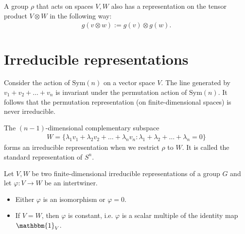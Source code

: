     \begin{example}
        A group $\rho$ that acts on spaces $V, W$ also has a representation on the tensor product  $V\otimes W$ in the following way:
        \begin{gather}
            g(v\otimes w) := g(v)\otimes g(w).
        \end{gather}
    \end{example}


\section{Irreducible representations}\label{section:irreducibility}


    \begin{example}
        Consider the action of $\text{Sym}(n)$ on a vector space $V$. The line generated by $v_1+v_2+\ldots+v_n$ is invariant under the permutation action of $\text{Sym}(n)$. It follows that the permutation representation (on finite-dimensional spaces) is never irreducible.

        The $(n-1)$-dimensional complementary subspace
        \begin{gather}
            W = \{\lambda_1v_1 + \lambda_2v_2 + \ldots + \lambda_nv_n:\lambda_1 + \lambda_2 + \ldots + \lambda_n = 0\}
        \end{gather}
        forms an irreducible representation when we restrict $\rho$ to $W$. It is called the standard representation of $S^n$.
    \end{example}

    \begin{theorem}\label{rep:schurs_lemma}
        Let $V, W$ be two finite-dimensional irreducible representations of a group $G$ and let $\varphi:V\rightarrow W$ be an intertwiner.
        \begin{itemize}
            \item Either $\varphi$ is an isomorphism or $\varphi=0$.
            \item If $V=W$, then $\varphi$ is constant, i.e. $\varphi$ is a scalar multiple of the identity map $\mathbbm{1}_V$.
        \end{itemize}
    \end{theorem}

